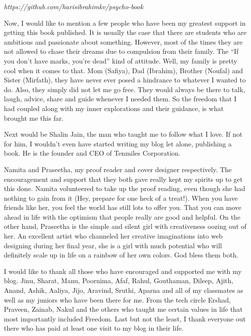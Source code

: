 \documentclass[twoside,11pt,titlepage]{article}
\begin{document}
\emph{https://github.com/harisibrahimkv/psycho-book}

Now, I would like to mention a few people who have been my greatest support in getting this book published. It is usually the case that there are students who are ambitious and passionate about something. However, most of the times they are not allowed to chase their dreams due to compulsion from their family. The ``If you don't have marks, you're dead'' kind of attitude. Well, my family is pretty cool when it comes to that. Mom (Safiya), Dad (Ibrahim), Brother (Noufal) and Sister (Mirfath), they have never ever posed a hindrance to whatever I wanted to do. Also, they simply did not let me go free. They would always be there to talk, laugh, advice, share and guide whenever I needed them. So the freedom that I had coupled along with my inner explorations and their guidance, is what brought me this far.

Next would be Shalin Jain, the man who taught me to follow what I love. If not for him, I wouldn't even have started writing my blog let alone, publishing a book. He is the founder and CEO of Tenmiles Corporation.

Namita and Praseetha, my proof reader and cover designer respectively. The encouragement and support that they both gave really kept my spirits up to get this done. Namita volunteered to take up the proof reading, even though she had nothing to gain from it (Hey, prepare for one heck of a treat!). When you have friends like her, you feel the world has still lots to offer you. That you can move ahead in life with the optimism that people really are good and helpful. On the other hand, Praseetha is the simple and silent girl with creativeness oozing out of her. An excellent artist who channeled her creative imaginations into web designing during her final year, she is a girl with much potential who will definitely scale up in life on a rainbow of her own colors. God bless them both.

I would like to thank all those who have encouraged and supported me with my blog. Jinu, Sharat, Manu, Poornima, Afaf, Rahul, Gouthaman, Dileep, Ajith, Anand, Ashik, Aaliya, Jijo, Aravind, Sruthi, Aparna and all of my classmates as well as my juniors who have been there for me. From the tech circle Ershad, Praveen, Zainab, Nakul and the others who taught me certain values in life that most importantly included Freedom. Last but not the least, I thank everyone out there who has paid at least one visit to my blog in their life.
\end{document}
